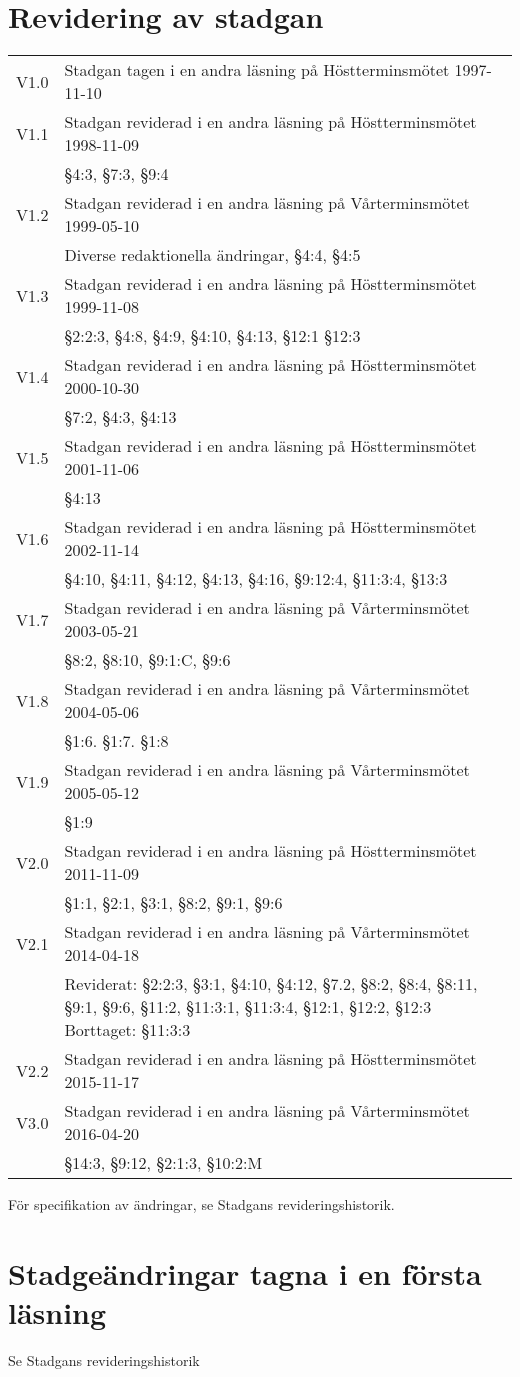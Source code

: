 \documentclass[10pt]{article}
\begin{document}
\newpage
\section*{Revidering av stadgan}

\renewcommand*\arraystretch{1}
\begin{tabular}{p{7mm} p{110mm}}
    V1.0 & Stadgan tagen i en andra läsning på Höstterminsmötet 1997-11-10\\
    V1.1 & Stadgan reviderad i en andra läsning på Höstterminsmötet 1998-11-09\\
    & §4:3, §7:3, §9:4\\
    V1.2 & Stadgan reviderad i en andra läsning på Vårterminsmötet 1999-05-10\\
    & Diverse redaktionella ändringar, §4:4, §4:5 \\
    V1.3 & Stadgan reviderad i en andra läsning på Höstterminsmötet 1999-11-08\\
    & §2:2:3, §4:8, §4:9, §4:10, §4:13, §12:1 §12:3\\
    V1.4 & Stadgan reviderad i en andra läsning på Höstterminsmötet 2000-10-30\\
    & §7:2, §4:3, §4:13\\
    V1.5 & Stadgan reviderad i en andra läsning på Höstterminsmötet 2001-11-06\\
    & §4:13\\
    V1.6 & Stadgan reviderad i en andra läsning på Höstterminsmötet 2002-11-14\\
    & §4:10, §4:11, §4:12, §4:13, §4:16, §9:12:4, §11:3:4, §13:3\\
    V1.7 & Stadgan reviderad i en andra läsning på Vårterminsmötet 2003-05-21\\
    & §8:2, §8:10, §9:1:C, §9:6 \\
    V1.8 & Stadgan reviderad i en andra läsning på Vårterminsmötet 2004-05-06\\
    & §1:6. §1:7. §1:8	\\
    V1.9 & Stadgan reviderad i en andra läsning på Vårterminsmötet 2005-05-12\\
    & §1:9\\
    V2.0 & Stadgan reviderad i en andra läsning på Höstterminsmötet 2011-11-09\\
    & §1:1, §2:1, §3:1, §8:2, §9:1, §9:6\\
     V2.1 & Stadgan reviderad i en andra läsning på Vårterminsmötet 2014-04-18\\
    & Reviderat: §2:2:3, §3:1, §4:10, §4:12, §7.2, §8:2, §8:4, §8:11, §9:1, §9:6, §11:2, §11:3:1,
    §11:3:4, §12:1, §12:2, §12:3
    Borttaget: §11:3:3\\
    V2.2 & Stadgan reviderad i en andra läsning på Höstterminsmötet 2015-11-17\\
    V3.0 & Stadgan reviderad i en andra läsning på Vårterminsmötet 2016-04-20\\
    & \S14:3, \S9:12, \S2:1:3, \S10:2:M\\
\end{tabular}
\renewcommand*\arraystretch{1.3}

För specifikation av ändringar, se Stadgans revideringshistorik.

\section*{Stadgeändringar tagna i en första läsning}

Se Stadgans revideringshistorik
\end{document}
